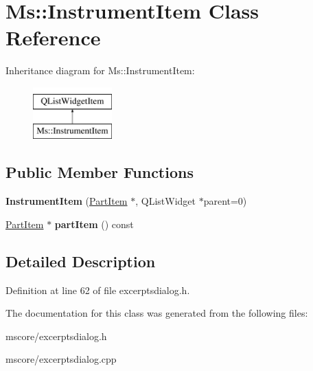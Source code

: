 \hypertarget{class_ms_1_1_instrument_item}{}\section{Ms\+:\+:Instrument\+Item Class Reference}
\label{class_ms_1_1_instrument_item}
Inheritance diagram for Ms\+:\+:Instrument\+Item\+:\begin{figure}[H]
\begin{center}
\leavevmode
\includegraphics[height=2.000000cm]{class_ms_1_1_instrument_item}
\end{center}
\end{figure}
\subsection*{Public Member Functions}
\begin{DoxyCompactItemize}
\item 
\mbox{\label{class_ms_1_1_instrument_item_ae8f4e479d4559ff56314fca1f21ac15f}} 
{\bfseries Instrument\+Item} (\hyperlink{class_ms_1_1_part_item}{Part\+Item} $\ast$, Q\+List\+Widget $\ast$parent=0)
\item 
\mbox{\label{class_ms_1_1_instrument_item_aa188ffd7ab2d196773d50a29198a76b1}} 
\hyperlink{class_ms_1_1_part_item}{Part\+Item} $\ast$ {\bfseries part\+Item} () const
\end{DoxyCompactItemize}


\subsection{Detailed Description}


Definition at line 62 of file excerptsdialog.\+h.



The documentation for this class was generated from the following files\+:\begin{DoxyCompactItemize}
\item 
mscore/excerptsdialog.\+h\item 
mscore/excerptsdialog.\+cpp\end{DoxyCompactItemize}
